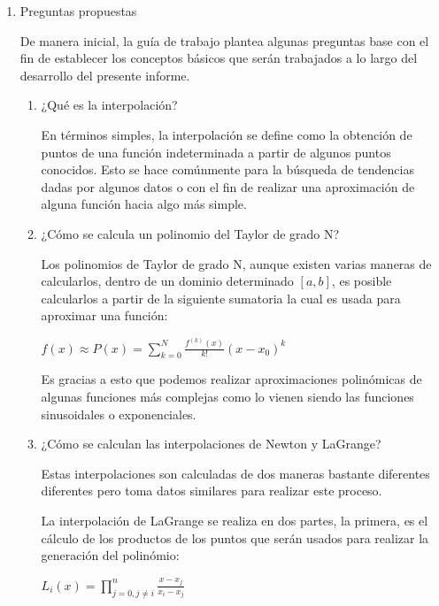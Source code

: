 \documentclass[english,notitlepage,letterpaper, 10pt]{article} %
\begin{document}
\begin{enumerate}
  
  \item Preguntas propuestas
  
    De manera inicial, la guía de trabajo plantea algunas preguntas base con el fin de establecer los conceptos básicos que serán trabajados a lo largo del desarrollo del presente informe.

    \begin{enumerate}
      \item ¿Qué es la interpolación?
      
      En términos simples, la interpolación se define como la obtención de puntos de una función indeterminada a partir de algunos puntos conocidos. Esto se hace comúnmente para la búsqueda de tendencias dadas por algunos datos o con el fin de realizar una aproximación de alguna función hacia algo más simple.

      \item ¿Cómo se calcula un polinomio del Taylor de grado N?
      
      Los polinomios de Taylor de grado N, aunque existen varias maneras de calcularlos, dentro de un dominio determinado $[a,b]$, es posible calcularlos a partir de la siguiente sumatoria la cual es usada para aproximar una función:

      \begin{center}
        \begin{math}
          f (x) \approx P (x) = \displaystyle\sum_{k=0}^{N} \frac{f^{(k)}(x)}{k!}(x-x_0)^k
        \end{math}
      \end{center}

      Es gracias a esto que podemos realizar aproximaciones polinómicas de algunas funciones más complejas como lo vienen siendo las funciones sinusoidales o exponenciales.

      \item ¿Cómo se calculan las interpolaciones de Newton y LaGrange?

      Estas interpolaciones son calculadas de dos maneras bastante diferentes diferentes pero toma datos similares para realizar este proceso.
      
      La interpolación de LaGrange se realiza en dos partes, la primera, es el cálculo de los productos de los puntos que serán usados para realizar la generación del polinómio:

      \begin{center}
        \begin{math}
          L_i(x) = \displaystyle\prod_{j=0, j \not= i}^{n} \frac{x-x_j}{x_i - x_j}
        \end{math}
      \end{center}


\end{enumerate}
\end{enumerate}
\end{document}
